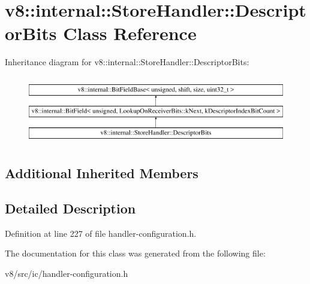 \hypertarget{classv8_1_1internal_1_1StoreHandler_1_1DescriptorBits}{}\section{v8\+:\+:internal\+:\+:Store\+Handler\+:\+:Descriptor\+Bits Class Reference}
\label{classv8_1_1internal_1_1StoreHandler_1_1DescriptorBits}
Inheritance diagram for v8\+:\+:internal\+:\+:Store\+Handler\+:\+:Descriptor\+Bits\+:\begin{figure}[H]
\begin{center}
\leavevmode
\includegraphics[height=3.000000cm]{classv8_1_1internal_1_1StoreHandler_1_1DescriptorBits}
\end{center}
\end{figure}
\subsection*{Additional Inherited Members}


\subsection{Detailed Description}


Definition at line 227 of file handler-\/configuration.\+h.



The documentation for this class was generated from the following file\+:\begin{DoxyCompactItemize}
\item 
v8/src/ic/handler-\/configuration.\+h\end{DoxyCompactItemize}

